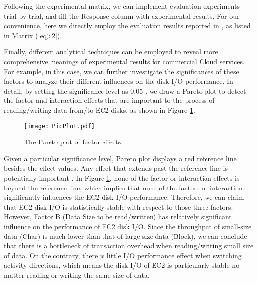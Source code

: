 \documentclass[10pt, conference, compsocconf]{IEEEtran}
\begin{document}
Following the experimental matrix, we can implement evaluation experiments trial by trial, and fill the Response column with experimental results. For our convenience, here we directly employ the evaluation results reported in \cite{Iosup_Ostermann_2011}, as listed in Matrix (\ref{eq>2}).

\begin{small}
 
\end{small}

Finally, different analytical techniques can be employed to reveal more comprehensive meanings of experimental results \cite{Antony_2003} for commercial Cloud services. For example, in this case, we can further investigate the significances of these factors to analyze their different influences on the disk I/O performance. In detail, by setting the significance level  as 0.05 \cite{Jackson_2011}, we draw a Pareto plot to detect the factor and interaction effects that are important to the process of reading/writing data from/to EC2 disks, as shown in Figure \ref{fig>PicPlot}. 

\begin{figure}[!t]
\centering
\texttt{[image: PicPlot.pdf]}
\caption{The Pareto plot of factor effects.}
\label{fig>PicPlot}
\end{figure}

Given a particular significance level, Pareto plot displays a red reference line besides the effect values. Any effect that extends past the reference line is potentially important \cite{Antony_2003}. In Figure \ref{fig>PicPlot}, none of the factor or interaction effects is beyond the reference line, which implies that none of the factors or interactions significantly influences the EC2 disk I/O performance. Therefore, we can claim that EC2 disk I/O is statistically stable with respect to those three factors. However, Factor B (Data Size to be read/written) has relatively significant influence on the performance of EC2 disk I/O. Since the throughput of small-size data (Char) is much lower than that of large-size data (Block), we can conclude that there is a bottleneck of transaction overhead when reading/writing small size of data. On the contrary, there is little I/O performance effect when switching activity directions, which means the disk I/O of EC2 is particularly stable no matter reading or writing the same size of data.
\end{document}
